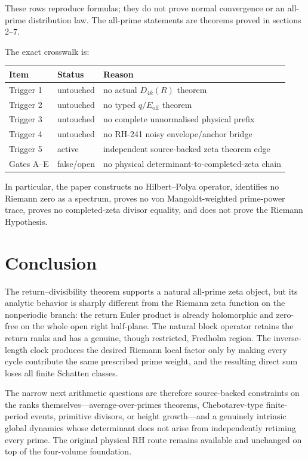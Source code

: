 \documentclass[11pt]{article}
\theoremstyle{remark}
\begin{document}
These rows reproduce formulas; they do not prove normal convergence or an
all-prime distribution law.  The all-prime statements are theorems proved in
sections 2--7.

The exact crosswalk is:
\begin{center}
\begin{tabular}{lll}
\toprule
Item & Status & Reason \\
\midrule
Trigger 1 & untouched & no actual \(D_{4k}(R)\) theorem \\
Trigger 2 & untouched & no typed \(q/E_{\mathrm{off}}\) theorem \\
Trigger 3 & untouched & no complete unnormalised physical prefix \\
Trigger 4 & untouched & no RH-241 noisy envelope/anchor bridge \\
Trigger 5 & active & independent source-backed zeta theorem edge \\
Gates A--E & false/open & no physical determinant-to-completed-zeta chain \\
\bottomrule
\end{tabular}
\end{center}

In particular, the paper constructs no Hilbert--Polya operator, identifies no
Riemann zero as a spectrum, proves no von Mangoldt-weighted prime-power trace,
proves no completed-zeta divisor equality, and does not prove the Riemann
Hypothesis.

\section{Conclusion}

The return--divisibility theorem supports a natural all-prime zeta object, but
its analytic behavior is sharply different from the Riemann zeta function on
the nonperiodic branch: the return Euler product is already holomorphic and
zero-free on the whole open right half-plane.  The natural block operator
retains the return ranks and has a genuine, though restricted, Fredholm
region.  The inverse-length clock produces the desired Riemann local factor
only by making every cycle contribute the same prescribed prime weight, and
the resulting direct sum loses all finite Schatten classes.

The narrow next arithmetic questions are therefore source-backed constraints
on the ranks themselves---average-over-primes theorems, Chebotarev-type
finite-period events, primitive divisors, or height growth---and a genuinely
intrinsic global dynamics whose determinant does not arise from independently
retiming every prime.  The original physical RH route remains available and
unchanged on top of the four-volume foundation.

\begingroup
\raggedright


\endgroup
\end{document}
